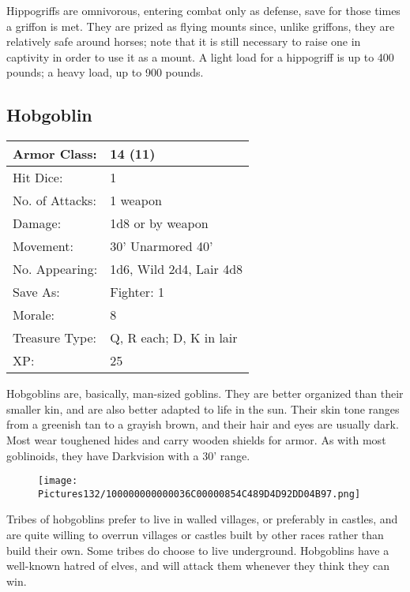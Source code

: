 \documentclass[a4paper,twoside,openany,10pt]{book}
\begin{document}
\begin{multicols}{2}
Hippogriffs are omnivorous, entering combat only as defense, save for those times a griffon is met. They are prized as flying mounts since, unlike griffons, they are relatively safe around horses; note that it is still necessary to raise one in captivity in order to use it as a mount. A light load for a hippogriff is up to 400 pounds; a heavy load, up to 900 pounds.

\subsection*{Hobgoblin}\label{hobgoblin}

\begin{tabularx}{0.50\textwidth}{@{}lX@{}}
Armor Class: & 14 (11) \\\hline
Hit Dice: & 1 \\\hline
No. of Attacks: & 1 weapon \\\hline
Damage: & 1d8 or by weapon \\\hline
Movement: & 30' Unarmored 40' \\\hline
No. Appearing: & 1d6, Wild 2d4, Lair 4d8 \\\hline
Save As: & Fighter: 1 \\\hline
Morale: & 8 \\\hline
Treasure Type: & Q, R each; D, K in lair \\\hline
XP: & 25 \\\hline
\end{tabularx}

Hobgoblins are, basically, man-sized goblins. They are better organized than their smaller kin, and are also better adapted to life in the sun. Their skin tone ranges from a greenish tan to a grayish brown, and their hair and eyes are usually dark. Most wear toughened hides and carry wooden shields for armor. As with most goblinoids, they have Darkvision with a 30' range.

\begin{wrapfigure}{r}{0.25\textwidth}
	\texttt{[image: Pictures132/100000000000036C00000854C489D4D92DD04B97.png]}
\end{wrapfigure}

Tribes of hobgoblins prefer to live in walled villages, or preferably in castles, and are quite willing to overrun villages or castles built by other races rather than build their own. Some tribes do choose to live underground. Hobgoblins have a well-known hatred of elves, and will attack them whenever they think they can win.


\end{multicols}
\end{document}
